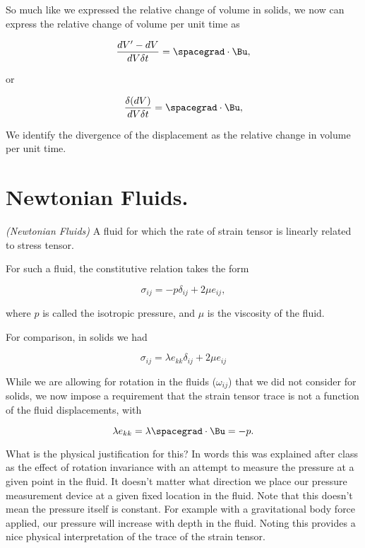 So much like we expressed the relative change of volume in solids, we now can express the relative change of volume per unit time as

\begin{equation}\label{eqn:continuumL9:190}
\frac{dV' - dV}{dV \delta t} = \spacegrad \cdot \Bu,
\end{equation}

or

\begin{equation}\label{eqn:continuumL9:210}
\frac{\delta(dV)}{dV \delta t} = \spacegrad \cdot \Bu,
\end{equation}

We identify the divergence of the displacement as the relative change in volume per unit time.

\section{Newtonian Fluids.}

\begin{definition}
\emph{(Newtonian Fluids)}
\label{dfn:continuumL9:230}
A fluid for which the rate of strain tensor is linearly related to stress tensor.
\end{definition}

For such a fluid, the constitutive relation takes the form

\begin{equation}\label{eqn:continuumL9:250}
\boxed{
\sigma_{ij} = - p \delta_{ij} + 2 \mu e_{ij},
}
\end{equation}

where $p$ is called the isotropic pressure, and $\mu$ is the viscosity of the fluid.

For comparison, in solids we had

\begin{equation}\label{eqn:continuumL9:270}
\sigma_{ij} = \lambda e_{kk} \delta_{ij} + 2 \mu e_{ij}
\end{equation}

While we are allowing for rotation in the fluids ($\omega_{ij}$) that we did not consider for solids, we now impose a requirement that the strain tensor trace is not a function of the fluid displacements, with

\begin{equation}\label{eqn:continuumL9:n}
\lambda e_{kk} = \lambda \spacegrad \cdot \Bu = -p.
\end{equation}

What is the physical justification for this?  In words this was explained after class as the effect of rotation invariance with an attempt to measure the pressure at a given point in the fluid.  It doesn't matter what direction we place our pressure measurement device at a given fixed location in the fluid.  Note that this doesn't mean the pressure itself is constant.  For example with a gravitational body force applied, our pressure will increase with depth in the fluid.  Noting this provides a nice physical interpretation of the trace of the strain tensor.

